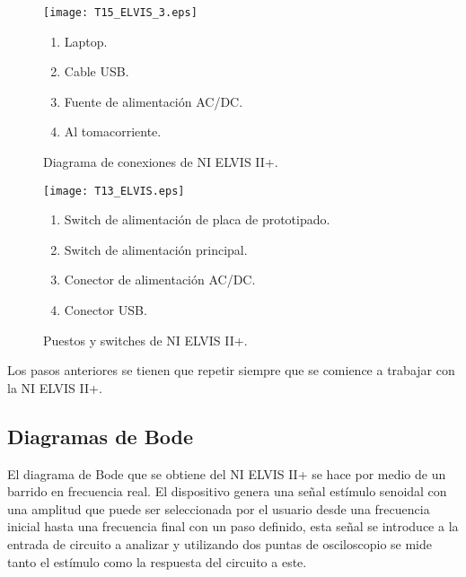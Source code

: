 	
	\begin{figure}[!ht]
		\begin{minipage}[c]{0.65\textwidth}
			\begin{center}
				\caption{Diagrama de conexiones de NI ELVIS II+.}
				\label{fig:T15_ELVIS_3}
				\texttt{[image: T15\_ELVIS\_3.eps]}
			\end{center}
		\end{minipage} \hfill \begin{minipage}[c]{0.3\textwidth}
			\begin{enumerate}
		  		\item Laptop.
				\item Cable USB.
				\item Fuente de alimentación AC/DC.
				\item Al tomacorriente.
			\end{enumerate}
		\end{minipage}
	\end{figure}
	
	
	\begin{figure}[!ht]
		\begin{minipage}[c]{0.65\textwidth}
			\begin{center}
				\caption{Puestos y switches de NI ELVIS II+.}
				\label{fig:T13_ELVIS}
				\texttt{[image: T13\_ELVIS.eps]}
			\end{center}
		\end{minipage} \hfill \begin{minipage}[c]{0.3\textwidth}
			\begin{enumerate}
		  		\item Switch de alimentación de placa de prototipado.
				\item Switch de alimentación principal.
				\item Conector de alimentación AC/DC.
				\item Conector USB.
			\end{enumerate}
		\end{minipage}
	\end{figure}
	
	Los pasos anteriores se tienen que repetir siempre que se comience a trabajar con la NI ELVIS II+.
	
		\subsection{Diagramas de Bode}\label{sec:diagrama_de_bode}
		
	El diagrama de Bode que se obtiene del NI ELVIS II+ se hace por medio de un barrido en frecuencia real. El dispositivo genera una señal estímulo senoidal con una amplitud que puede ser seleccionada por el usuario desde una frecuencia inicial hasta una frecuencia final con un paso definido, esta señal se introduce a la entrada de circuito a analizar y utilizando dos puntas de osciloscopio se mide tanto el estímulo como la respuesta del circuito a este. 
	
